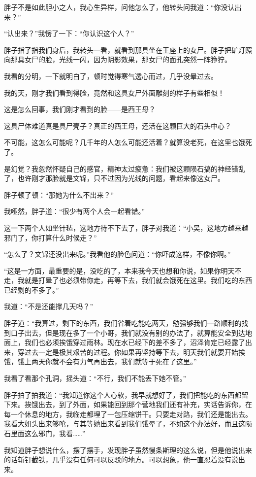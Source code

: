 胖子不是如此胆小之人，我心生异样，问他怎么了，他转头问我道：“你没认出来？”

“认出来？”我愣了一下：“你认识这个人？”

胖子指了指我们身后，我转头一看，就看到那具坐在王座上的女尸。胖子把矿灯照向那具女尸的脸，光线一闪，因为阴影效果，那女尸的面孔突然一阵狰狞。

我看的分明，一下就明白了，顿时觉得寒气透心而过，几乎没晕过去。

我的天，刚才我们看到得脸，竟然和这具女尸外面雕刻的样子有些相似！

这是怎么回事，我们刚才看到的脸——是西王母？

这具尸体难道真是具尸壳子？真正的西王母，还活在这颗巨大的石头中心？

不可能，这怎么可能呢？几千年的人怎么可能还活着？就算没老死，在这里也饿死了。

是幻觉？我忽然怀疑自己的感官，精神太过疲惫：我们被这颗陨石搞的神经错乱了，也许刚才那脸就是文锦，只不过因为光线的问题，看起来像这女尸。

胖子顿了顿：“那她为什么不出来？”

我哑然，胖子道：“很少有两个人会一起看错。”

这一下两个人如坐针毡，这地方待不下去了，胖子对我道：“小吴，这地方越来越邪门了，你打算什么时候走？”

“怎么了？文锦还没出来呢。”我看他的脸色问道：“你吓成这样，不像你啊。”

“这是一方面，最重要的是，没吃的了，本来我今天也想和你说，如果你明天不走，我就是打晕了也必须带你走，再等下去，我们就会饿死在这里。我们吃的东西已经剩的不多了。”

我道：“不是还能撑几天吗？”

胖子道：“我算过，剩下的东西，我们省着吃能吃两天，勉强够我们一路顺利的找到口子出去，但是现在多了一个小哥，我们就没有别的办法了，就算能安全到达地面上，我们也必须挨饿穿过雨林。现在水已经下的差不多了，沼泽肯定已经露了出来，穿过去一定是极其艰苦的过程。你如果再坚持等下去，明天我们就要开始挨饿，饿上两天你就不会有力气再出去，我们就等于死在了这里。”

我看了看那个孔洞，摇头道：“不行，我们不能丢下她不管。”

胖子拍了拍我道：“我知道你这个人心软，我早就想好了，我们把能吃的东西都留下来。挨饿出去，到了外面，如果能回到那个营地我们还有补充，实话告诉你，在每一个休息的地方，我临走都埋了一包压缩饼干。只要走对路，我们还是能出去。我看大姐头出来够呛，与其等她出来看到我们饿晕了，不如这个办法好，而且这陨石里面这么邪门，我看……”

我知道胖子想说什么，摆了摆手，发现胖子虽然慢条斯理的这么说，但是他说出来的话斩钉截铁，几乎没有任何可以反驳的地方。可以想象，他一直忍着没有说出来。

